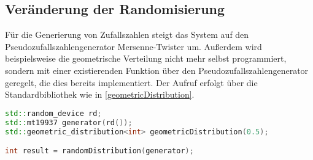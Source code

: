 
\subsection{Veränderung der Randomisierung}

Für die Generierung von Zufallszahlen steigt das System auf den Pseudozufallszahlengenerator Mersenne-Twister \autocite{matsumoto1998mersenne} um. Außerdem wird beispielsweise die geometrische Verteilung nicht mehr selbst programmiert, sondern mit einer existierenden Funktion über den Pseudozufallszahlengenerator geregelt, die dies bereits implementiert. Der Aufruf erfolgt über die Standardbibliothek wie in \autoref{geometricDistribution}.

\begin{lstlisting}[label={geometricDistribution}, language=C++, caption={Geometrische Verteilung mittels C++}]
std::random_device rd;
std::mt19937 generator(rd());
std::geometric_distribution<int> geometricDistribution(0.5);

int result = randomDistribution(generator);
\end{lstlisting}